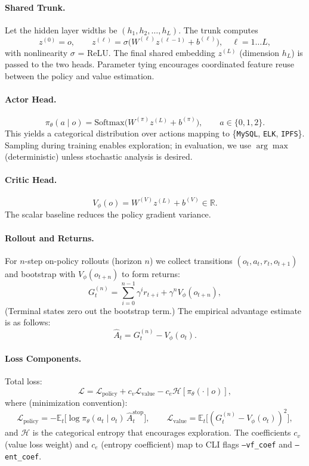 \paragraph{Shared Trunk.}
Let the hidden layer widths be $(h_1, h_2, \dots, h_L)$. The trunk computes
\[
z^{(0)} = o,\qquad
z^{(\ell)} = \sigma\!\big(W^{(\ell)} z^{(\ell-1)} + b^{(\ell)}\big), \quad \ell=1\dots L,
\]
with nonlinearity $\sigma$ = ReLU. The final shared embedding $z^{(L)}$ (dimension $h_L$) is passed to the two heads. Parameter tying encourages coordinated feature reuse between the policy and value estimation.

\paragraph{Actor Head.}
\[
\pi_{\theta}(a \mid o) = \text{Softmax}\big(W^{(\pi)} z^{(L)} + b^{(\pi)}\big), \qquad a \in \{0,1,2\}.
\]
This yields a categorical distribution over actions mapping to \{\texttt{MySQL}, \texttt{ELK}, \texttt{IPFS}\}. Sampling during training enables exploration; in evaluation, we use $\arg\max$ (deterministic) unless stochastic analysis is desired.

\paragraph{Critic Head.}
\[
V_{\phi}(o) = W^{(V)} z^{(L)} + b^{(V)} \in \mathbb{R}.
\]
The scalar baseline reduces the policy gradient variance.

\paragraph{Rollout and Returns.}
For $n$-step on-policy rollouts (horizon $n$) we collect transitions
$(o_t, a_t, r_t, o_{t+1})$ and bootstrap with $V_{\phi}(o_{t+n})$ to form returns:
\[
G_t^{(n)} = \sum_{i=0}^{n-1} \gamma^{i} r_{t+i} + \gamma^{n} V_{\phi}(o_{t+n}),
\]
(Terminal states zero out the bootstrap term.) The empirical advantage estimate is as follows:
\[
\hat{A}_t = G_t^{(n)} - V_{\phi}(o_t).
\]

\paragraph{Loss Components.}
Total loss:
\[
\mathcal{L} = \mathcal{L}_{\text{policy}} + c_v \mathcal{L}_{\text{value}} - c_e \mathcal{H}[\pi_{\theta}(\cdot \mid o)],
\]
where (minimization convention):
\[
\mathcal{L}_{\text{policy}} = - \mathbb{E}_t \big[ \log \pi_{\theta}(a_t \mid o_t)\, \hat{A}_t^{\text{stop}}\big], \qquad
\mathcal{L}_{\text{value}} = \mathbb{E}_t \big[ (G_t^{(n)} - V_{\phi}(o_t))^2 \big],
\]
and $\mathcal{H}$ is the categorical entropy that encourages exploration. The coefficients $c_v$ (value loss weight) and $c_e$ (entropy coefficient) map to CLI flags \texttt{--vf\_coef} and \texttt{--ent\_coef}.


